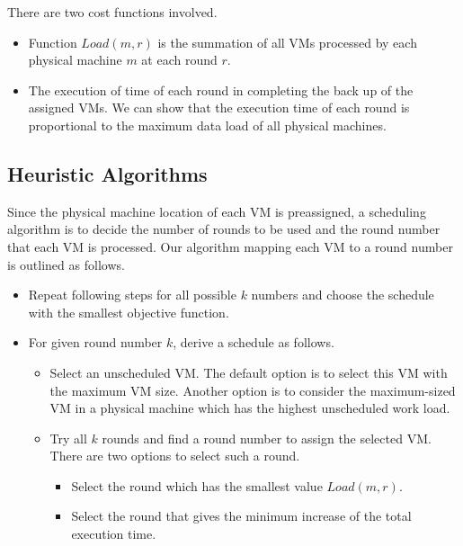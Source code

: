 There are two cost functions involved.
\begin{itemize}
\item Function $Load(m, r)$  is
the summation of all VMs  processed by each physical machine $m$ at each round $r$.
\item The execution of time of each round in completing the back up of the assigned VMs.
We can show that the execution time of each round is proportional to the maximum
data load of all physical machines.
\end{itemize}


\subsection{Heuristic Algorithms}

Since the physical machine location of each VM is preassigned,
a scheduling algorithm is to decide the number of rounds to be used
and the round number that each VM is processed.
Our algorithm mapping each VM to a round number is outlined as follows.
\begin{itemize}
\item Repeat following steps for all possible $k$ numbers and choose the schedule
with the smallest objective function.
\item For given round number $k$, derive  a schedule as follows.
	\begin{itemize}
	\item Select an unscheduled VM. The default option is to select this VM with the maximum VM size.
Another option is to consider the maximum-sized VM in a physical machine which has the highest 
unscheduled work load.
	\item Try all $k$ rounds and find a round number  to assign the selected VM. 
There are two options to select such a round.
		\begin{itemize}
		\item Select the round which has the smallest value $Load(m,r)$.
		\item Select the round that  gives the minimum increase of the total execution time.
		\end{itemize}
	\end{itemize}
\end{itemize}



